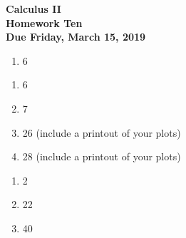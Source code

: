 \documentclass[12pt]{article}
\begin{document}
\pagestyle{empty}

\begin{center}
{\large {\bf Calculus II}}\\
\medskip
{\large {\bf Homework Ten}}\\
\medskip
{ {\bf Due Friday, March 15, 2019}}\\
\end{center}



\begin{enumerate}
\setlength{\itemsep}{-1mm}
  \item 6
\end{enumerate}



\begin{enumerate}
\setlength{\itemsep}{-1mm}
\item 6
\item 7
\item 26 (include a printout of your plots)
\item 28 (include a printout of your plots)
\end{enumerate}

\begin{enumerate}
\setlength{\itemsep}{-1mm}
  \item 2
  \item 22
  \item 40
\end{enumerate}
\end{document}
